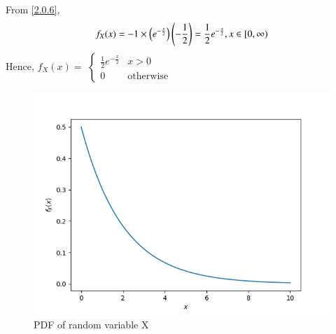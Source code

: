 \documentclass[journal,12pt,twocolumn]{IEEEtran}
\begin{document}
  From \eqref{2.0.6},
  \begin{align}
      f_X(x)=-1\times \left(e^{-\frac{x}{2}}\right)\left(-\frac{1}{2}\right)=\frac{1}{2}e^{-\frac{x}{2}},x\in[0,\infty)
  \end{align}
  Hence,
  $f_X(x)=$
$\begin{cases}
\frac{1}{2}e^{-\frac{x}{2}} & x>0\\
0 & \mathrm{otherwise}
\end{cases}$
\begin{figure}[h]
\begin{center}
\includegraphics[scale=0.27]{Figure_1.png}
\end{center}
\caption{PDF of random variable X}\label{fig1}
\end{figure}
\end{document}
